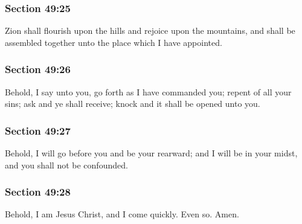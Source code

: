 	\subsubsection{Section 49:25} %
		\label{DC49-25}

		Zion shall flourish upon the hills and rejoice upon the mountains, and shall be assembled together unto the place which I have appointed.


	\subsubsection{Section 49:26} %
		\label{DC49-26}

		Behold, I say unto you, go forth as I have commanded you; repent of all your sins; ask and ye shall receive; knock and it shall be opened unto you.


	\subsubsection{Section 49:27} %
		\label{DC49-27}

		Behold, I will go before you and be your rearward; and I will be in your midst, and you shall not be confounded.


	\subsubsection{Section 49:28} %
		\label{DC49-28}

		Behold, I am Jesus Christ, and I come quickly.  Even so.  Amen.


